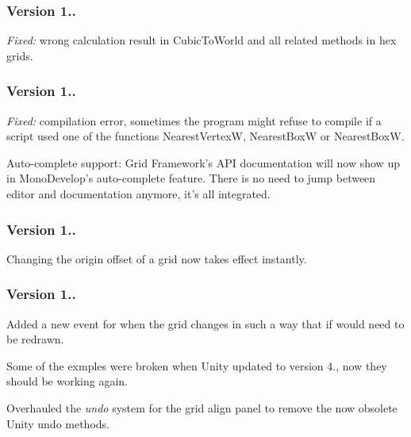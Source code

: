 \subsubsection*{Version 1..}


\begin{DoxyItemize}
\item {\itshape Fixed\+:} wrong calculation result in {\ttfamily Cubic\+To\+World} and all related methods in hex grids.
\end{DoxyItemize}

\subsubsection*{Version 1..}


\begin{DoxyItemize}
\item {\itshape Fixed\+:} compilation error, sometimes the program might refuse to compile if a script used one of the functions Nearest\+Vertex\+W, Nearest\+Box\+W or Nearest\+Box\+W.
\item Auto-\/complete support\+: Grid Framework's A\+P\+I documentation will now show up in Mono\+Develop's auto-\/complete feature. There is no need to jump between editor and documentation anymore, it's all integrated.
\end{DoxyItemize}

\subsubsection*{Version 1..}


\begin{DoxyItemize}
\item Changing the origin offset of a grid now takes effect instantly.
\end{DoxyItemize}

\subsubsection*{Version 1..}


\begin{DoxyItemize}
\item Added a new event for when the grid changes in such a way that if would need to be redrawn.
\item Some of the exmples were broken when Unity updated to version 4., now they should be working again.
\item Overhauled the {\itshape undo} system for the grid align panel to remove the now obsolete Unity undo methods.
\end{DoxyItemize}

